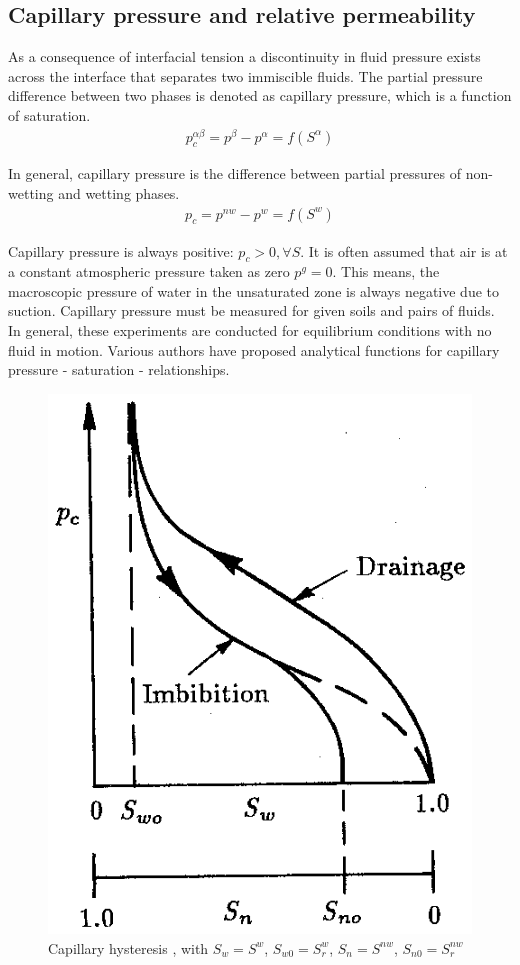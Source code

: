 \subsection{Capillary pressure and relative permeability}

As a consequence of interfacial tension a discontinuity in fluid
pressure exists across the interface that separates two immiscible
fluids. The partial pressure difference between two phases is
denoted as capillary pressure, which is a function of saturation.
%
\begin{eqnarray}
p_c^{\alpha\beta} = p^\beta -
p^\alpha = f(S^\alpha)
\end{eqnarray}

In general, capillary pressure is the difference between partial
pressures of non-wetting and wetting phases.
\begin{eqnarray}
p_c = p^{nw} - p^w =
f(S^w) 
\label{eqn:capillary_pressure}
\end{eqnarray}

Capillary pressure is always positive: $p_c>0 ,
\forall S$. It is often assumed that air is at a constant
atmospheric pressure taken as zero $p^g=0$. This means,
the macroscopic pressure of water in the unsaturated zone is
always negative due to suction.
%
Capillary pressure must be measured for given soils and pairs of
fluids. In general, these experiments are conducted for
equilibrium conditions with no fluid in motion. Various authors
have proposed analytical functions for capillary pressure -
saturation - relationships. 

\begin{figure}[htb!]
\begin{center}
\includegraphics[width=0.43\columnwidth]{figures/HYSTER.EPS}
\caption{Capillary hysteresis \cite{Bea:72}, with
$S_{w} = S^w$, $S_{w0} =
S_r^w$, $S_{n} = S^{nw}$,
$S_{n0} = S_r^{nw}$ } 
\label{fig:hysteresis}
\end{center}
\end{figure}
%

